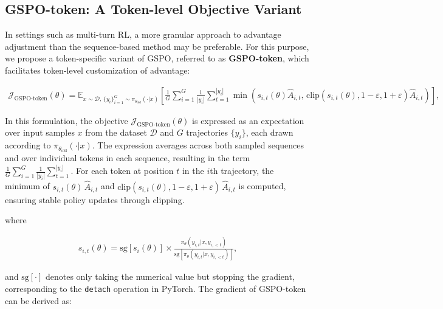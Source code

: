 \subsection{GSPO-token: A Token-level Objective Variant}

In settings such as multi-turn RL, a more granular approach to advantage adjustment than the sequence-based method may be preferable. For this purpose, we propose a token-specific variant of GSPO, referred to as \textbf{GSPO-token}, which facilitates token-level customization of advantage:

\begin{align}
\mathcal{J}_\text{GSPO-token}(\theta)
=
\mathbb{E}_{ x \sim \mathcal{D},\, \{y_i\}_{i=1}^G \sim \pi_{\theta_\text{old}}( \cdot | x) }
\left[ 
\frac{1}{G} \sum_{i=1}^{G} \frac{1}{|y_i|} \sum_{t=1}^{|y_i|} 
\min \left( s_{i,t}(\theta) \widehat{A}_{i,t},  \, \mathrm{clip} \left( s_{i,t}(\theta), 1 - {\varepsilon}, 1 + {\varepsilon} \right) \widehat{A}_{i,t} \right) 
\right],
\label{equ:gspo-token}
\end{align}

In this formulation, the objective $\mathcal{J}_\text{GSPO-token}(\theta)$ is expressed as an expectation over input samples $x$ from the dataset $\mathcal{D}$ and $G$ trajectories $\{y_i\}$, each drawn according to $\pi_{\theta_\text{old}}(\cdot | x)$. The expression averages across both sampled sequences and over individual tokens in each sequence, resulting in the term $\frac{1}{G} \sum_{i=1}^{G} \frac{1}{|y_i|} \sum_{t=1}^{|y_i|}$. For each token at position $t$ in the $i$th trajectory, the minimum of $s_{i,t}(\theta)\,\widehat{A}_{i,t}$ and $\mathrm{clip}(s_{i,t}(\theta), 1-{\varepsilon}, 1+{\varepsilon})\,\widehat{A}_{i,t}$ is computed, ensuring stable policy updates through clipping.

where

\begin{align}
s_{i,t}(\theta) 
= \mathrm{sg} \left[ s_{i}(\theta) \right]  \times \frac{ \pi_{\theta} (y_{i,t} | x, y_{i,<t}) }{ \mathrm{sg} \left[ \pi_{\theta} (y_{i,t} | x, y_{i,<t}) \right] },
\end{align}

and $\mathrm{sg}[\cdot]$ denotes only taking the numerical value but stopping the gradient, corresponding to the \texttt{detach} operation in PyTorch. The gradient of GSPO-token can be derived as:

